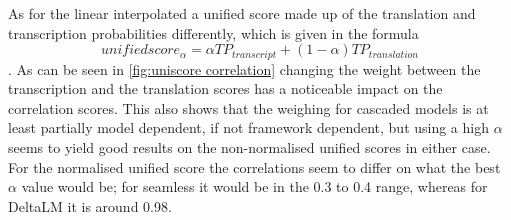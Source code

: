 As for the linear interpolated a unified score made up of the translation and transcription probabilities differently, which is given in the formula $$unifiedscore_\alpha= \alpha TP_{transcript} + (1-\alpha)TP_{translation}$$. 
As can be seen in \autoref{fig:uniscore correlation} changing the weight between the transcription and the translation scores has a noticeable impact on the correlation scores. 
This also shows that the weighing for cascaded models is at least partially model dependent, if not framework dependent, but using a high $\alpha$ seems to yield good results on the non-normalised unified scores in either case. 
For the normalised unified score the correlations seem to differ on what the best $\alpha$ value would be; for seamless it would be in the 0.3 to 0.4 range, whereas for DeltaLM it is around 0.98. 

